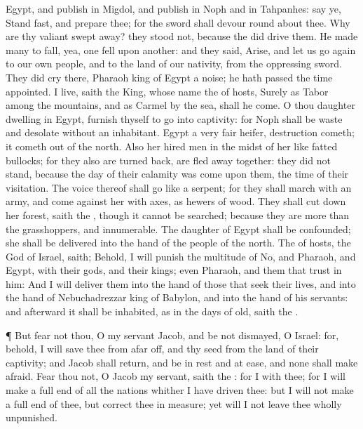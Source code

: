 {Egypt, and
publish in
Migdol, and
publish in
Noph and in
Tahpanhes:
say ye, Stand
fast, and
prepare thee; for the
sword shall
devour round
about thee.
Why are thy
valiant
{} swept
away? they
stood not, because the
{} did
drive them.
He made
many to
fall, yea,
one
fell upon
another: and they
said,
Arise, and let us go
again to our own
people, and to the
land of our
nativity,
from the
oppressing
sword.
They did
cry there,
Pharaoh
king of
Egypt
{} a
noise; he hath
passed the time
appointed.
 I
live,
saith the
King, whose
name
{} the
{} of
hosts, Surely as
Tabor
{} among the
mountains, and as
Carmel by the
sea,
{} shall he
come.
O thou
daughter
dwelling in
Egypt,
furnish thyself to go into
captivity: for
Noph shall be
waste and
desolate without an
inhabitant.
Egypt
{} a very
fair
heifer,
{}
destruction
cometh; it cometh
out of the
north.
Also her hired
men
{} in the
midst of her like
fatted
bullocks; for they also are turned
back,
{} are fled
away
together: they did not
stand, because the
day of their
calamity was
come upon them,
{} the
time of their
visitation.
The
voice thereof shall
go like a
serpent; for they shall
march with an
army, and
come against her with
axes, as
hewers of
wood.
They shall cut
down her
forest,
saith the
{}, though it cannot be
searched; because they are
more than the
grasshoppers, and
{}
innumerable.
The
daughter of
Egypt shall be
confounded; she shall be
delivered into the
hand of the
people of the
north.
The
{} of
hosts, the
God of
Israel,
saith; Behold, I will
punish the
multitude of
No, and
Pharaoh, and
Egypt, with their
gods, and their
kings; even
Pharaoh, and
{} them that
trust in him:
And I will
deliver them into the
hand of those that
seek their
lives, and into the
hand of
Nebuchadrezzar
king of
Babylon, and into the
hand of his
servants: and
afterward it shall be
inhabited, as in the
days of
old,
saith the
{}.
\par }{\PP {}¶ But
fear not thou, O my
servant
Jacob, and be not
dismayed, O
Israel: for, behold, I will
save thee from afar
off, and thy
seed from the
land of their
captivity; and
Jacob shall
return, and be in
rest and at
ease, and none shall make
{}
afraid.
Fear thou not, O
Jacob my
servant,
saith the
{}: for I
{} with thee; for I will
make a full
end of all the
nations whither I have
driven thee: but I will not
make a full
end of thee, but
correct thee in
measure; yet will I not leave thee
wholly
unpunished.

}
